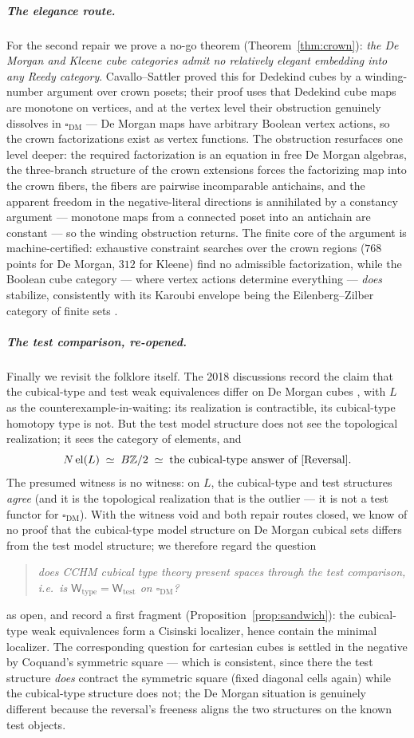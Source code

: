 \documentclass[11pt]{amsart}
\theoremstyle{definition}
\newcommand{\cube}{\square_{\mathrm{DM}}}
\newcommand{\el}{\mathrm{el}}
\newcommand{\Ldash}{L}
\newcommand{\Wtest}{\mathsf{W}_{\mathrm{test}}}
\newcommand{\Wtype}{\mathsf{W}_{\mathrm{type}}}
\begin{document}
\subparagraph*{The elegance route.}  For the second repair we prove
a no-go theorem (Theorem~\ref{thm:crown}): \emph{the De Morgan and
Kleene cube categories admit no relatively elegant embedding into
any Reedy category}.  Cavallo--Sattler proved this for Dedekind
cubes \cite[Thm.~A.14]{CavalloSattlerElegance} by a winding-number
argument over crown posets; their proof uses that Dedekind cube
maps are monotone on vertices, and at the vertex level their
obstruction genuinely dissolves in $\cube$ --- De Morgan maps have
arbitrary Boolean vertex actions, so the crown factorizations exist
as vertex functions.  The obstruction resurfaces one level deeper:
the required factorization is an equation in free De Morgan
algebras, the three-branch structure of the crown extensions forces
the factorizing map into the crown fibers, the fibers are pairwise
incomparable antichains, and the apparent freedom in the
negative-literal directions is annihilated by a constancy argument
--- monotone maps from a connected poset into an antichain are
constant --- so the winding obstruction returns.  The finite core
of the argument is machine-certified: exhaustive constraint
searches over the crown regions ($768$ points for De Morgan, $312$
for Kleene) find no admissible factorization, while the Boolean
cube category --- where vertex actions determine everything ---
\emph{does} stabilize, consistently with its Karoubi envelope being
the Eilenberg--Zilber category of finite sets \cite{Campion}.

\subparagraph*{The test comparison, re-opened.}  Finally we revisit
the folklore itself.  The 2018 discussions record the claim that
the cubical-type and test weak equivalences differ on De Morgan
cubes \cite{CoqML}, with $\Ldash$ as the counterexample-in-waiting:
its realization is contractible, its cubical-type homotopy type is
not.  But the test model structure does not see the topological
realization; it sees the category of elements, and
\[
  N\,\el(\Ldash) \;\simeq\; B\mathbb{Z}/2
  \;\simeq\; \text{the cubical-type answer of \cite{Reversal}}.
\]
The presumed witness is no witness: on $\Ldash$, the cubical-type
and test structures \emph{agree} (and it is the topological
realization that is the outlier --- it is not a test functor for
$\cube$).  With the witness void and both repair routes closed, we
know of no proof that the cubical-type model structure on De
Morgan cubical sets differs from the test model structure; we
therefore regard the question
\begin{quote}
  \emph{does CCHM cubical type theory present spaces through the
  test comparison, i.e.\ is $\Wtype = \Wtest$ on $\cube$?}
\end{quote}
as open, and record a first fragment
(Proposition~\ref{prop:sandwich}): the cubical-type weak
equivalences form a Cisinski localizer, hence contain the minimal
localizer.  The corresponding question for cartesian cubes is
settled in the negative by Coquand's symmetric square
\cite{CoqNote} --- which is consistent, since there the test
structure \emph{does} contract the symmetric square (fixed
diagonal cells again) while the cubical-type structure does not;
the De Morgan situation is genuinely different because the
reversal's freeness aligns the two structures on the known test
objects.
\end{document}
